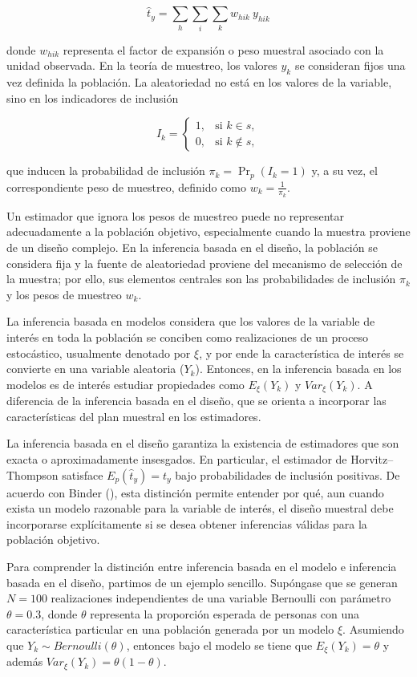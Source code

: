 \documentclass[
  spanish,
  11pt,
  letterpaper,
  oneside,
  open=any]{scrbook}
\begin{document}
\[
\hat{t}_y = \sum_h \sum_i \sum_k w_{hik} \ y_{hik}
\]

donde \(w_{hik}\) representa el factor de expansión o peso muestral
asociado con la unidad observada. En la teoría de muestreo, los valores
\(y_k\) se consideran fijos una vez definida la población. La
aleatoriedad no está en los valores de la variable, sino en los
indicadores de inclusión

\[
I_k =
\begin{cases}
1, & \text{si } k \in s,\\
0, & \text{si } k \notin s,
\end{cases}
\]

que inducen la probabilidad de inclusión \(\pi_k = \Pr_p(I_k=1)\) y, a
su vez, el correspondiente peso de muestreo, definido como
\(w_k = \frac{1}{\pi_k}\).

Un estimador que ignora los pesos de muestreo puede no representar
adecuadamente a la población objetivo, especialmente cuando la muestra
proviene de un diseño complejo. En la inferencia basada en el diseño, la
población se considera fija y la fuente de aleatoriedad proviene del
mecanismo de selección de la muestra; por ello, sus elementos centrales
son las probabilidades de inclusión \(\pi_k\) y los pesos de muestreo
\(w_k\).

La inferencia basada en modelos considera que los valores de la variable
de interés en toda la población se conciben como realizaciones de un
proceso estocástico, usualmente denotado por \(\xi\), y por ende la
característica de interés se convierte en una variable aleatoria
(\(Y_k\)). Entonces, en la inferencia basada en los modelos es de
interés estudiar propiedades como \(E_{\xi}(Y_k)\) y \(Var_{\xi}(Y_k)\).
A diferencia de la inferencia basada en el diseño, que se orienta a
incorporar las características del plan muestral en los estimadores.

La inferencia basada en el diseño garantiza la existencia de estimadores
que son exacta o aproximadamente insesgados. En particular, el estimador
de Horvitz--Thompson satisface \(E_{p}(\hat{t}_y) = t_y\) bajo
probabilidades de inclusión positivas. De acuerdo con Binder
(), esta distinción permite
entender por qué, aun cuando exista un modelo razonable para la variable
de interés, el diseño muestral debe incorporarse explícitamente si se
desea obtener inferencias válidas para la población objetivo.

Para comprender la distinción entre inferencia basada en el modelo e
inferencia basada en el diseño, partimos de un ejemplo sencillo.
Supóngase que se generan \(N=100\) realizaciones independientes de una
variable Bernoulli con parámetro \(\theta=0.3\), donde \(\theta\)
representa la proporción esperada de personas con una característica
particular en una población generada por un modelo \(\xi\). Asumiendo
que \(Y_k \sim Bernoulli(\theta)\), entonces bajo el modelo se tiene que
\(E_{\xi}(Y_k) = \theta\) y además
\(Var_{\xi}(Y_k) = \theta(1-\theta)\).
\end{document}
